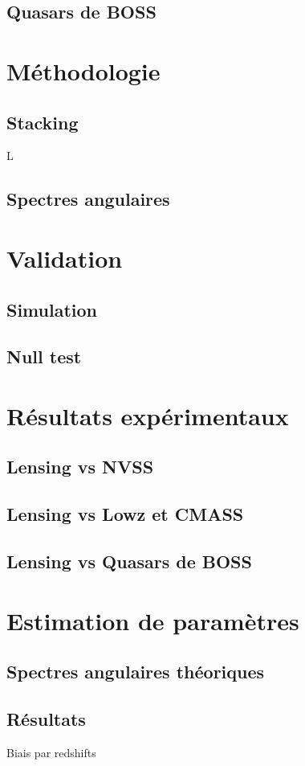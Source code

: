 \subsection{Quasars de BOSS}

\section{Méthodologie}
\subsection{Stacking}

L

\subsection{Spectres angulaires}

\section{Validation}
\subsection{Simulation}
\subsection{Null test}

\section{Résultats expérimentaux}
\subsection{Lensing vs NVSS}
\subsection{Lensing vs Lowz et CMASS}
\subsection{Lensing vs Quasars de BOSS}

\section{Estimation de paramètres}
\subsection{Spectres angulaires théoriques}
\subsection{Résultats}
Biais par redshifts